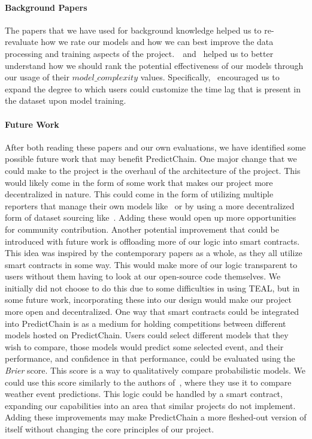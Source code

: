 \documentclass{article}
\begin{document}
    \paragraph{Background Papers}
    The papers that we have used for background knowledge helped us to re-revaluate how we rate our models and how we can best
    improve the data processing and training aspects of the project.~\cite{LSTM}~and~\cite{recurrentModeling} helped
    us to better understand how we should rank the potential effectiveness of our models through our usage of
    their $model\_complexity$ values.  Specifically,~\cite{LSTM} encouraged us to expand the degree to
    which users could customize the time lag that is present in the dataset upon model training.

    \paragraph{Future Work}
    After both reading these papers and our own evaluations, we have identified some possible future work that may
    benefit PredictChain.  One major change that we could make to the project is the overhaul of the architecture of
    the project.  This would likely come in the form of some work that makes our project more decentralized in nature.
    This could come in the form of utilizing multiple reporters that manage their own models like~\cite{windForcasting}
    or by using a more decentralized form of dataset sourcing like~\cite{priceOfTrust}.  Adding these would open up more
    opportunities for community contribution.  Another potential improvement that could be introduced with future work is
    offloading more of our logic into smart contracts.  This idea was inspired by the contemporary papers as a whole, as
    they all utilize smart contracts in some way.  This would make more of our logic transparent to users without them having
    to look at our open-source code themselves.  We initially did not choose to do this due to some difficulties in using TEAL,
    but in some future work, incorporating these into our design would make our project more open and decentralized.
    One way that smart contracts could be integrated into PredictChain is as a medium for holding competitions between
    different models hosted on PredictChain.  Users could select different models that they wish to compare, those
    models would predict some selected event, and their performance, and confidence in that performance, could be evaluated
    using the \textit{Brier} score.  This score is a way to qualitatively compare probabilistic models.  We could use this
    score similarly to the authors of~\cite{brierScore}, where they use it to compare weather event predictions.
    This logic could be handled by a smart contract, expanding our capabilities into an area that similar projects do not
    implement.  Adding these improvements may make PredictChain a more fleshed-out version of itself without changing the
    core principles of our project.

    \pagebreak
    
    
\end{document}
